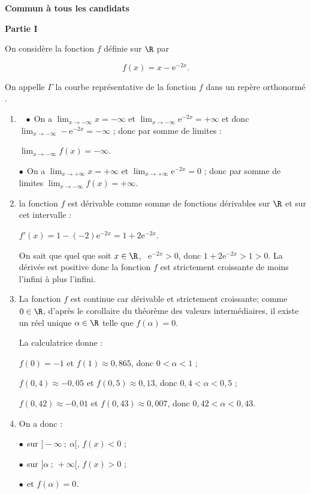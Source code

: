 
\textbf{Commun à tous les candidats}

\medskip

\begin{center}\textbf{Partie I}\end{center}

On considère la fonction $f$ définie sur $\R$ par 

\[f(x) = x - \text{e}^{-2x}.\]

On appelle $\Gamma$ la courbe représentative de la fonction $f$ dans un repère orthonormé \Oij.

\medskip

\begin{enumerate}
\item ~%
$\bullet~~$On a $\displaystyle\lim_{x \to - \infty} x = - \infty$ et $\displaystyle\lim_{x \to - \infty}\text{e}^{-2x} = + \infty$ et donc $\displaystyle\lim_{x \to - \infty}-\text{e}^{-2x} = - \infty$ ; donc par somme de limites :

$\displaystyle\lim_{x \to - \infty}f(x) = - \infty$.

$\bullet~~$On a $\displaystyle\lim_{x \to + \infty} x  = + \infty$ et $\displaystyle\lim_{x \to + \infty}\text{e}^{-2x} = 0$ ; donc par somme de limites  $\displaystyle\lim_{x \to - \infty}f(x) = + \infty$.
\item %
la fonction $f$ est dérivable comme somme de fonctions dérivables sur $\R$ et sur cet intervalle :

$f'(x) = 1 - (- 2)\text{e}^{-2x} = 1 + 2\text{e}^{-2x}$.

On sait que quel que soit $x \in \R$, \, $\text{e}^{-2x} > 0$, donc $ 1 + 2\text{e}^{-2x} > 1 > 0$.
La dérivée est positive donc la fonction $f$ est strictement croissante de moins l'infini à plus l'infini.
\item %
La fonction $f$ est continue car dérivable et strictement croissante; comme $0 \in \R$, d'après le corollaire du théorème des valeurs intermédiaires, il existe un réel unique $\alpha \in \R$ telle que $f(\alpha) = 0$.

La calculatrice donne  :

$f(0) = - 1$ et $f(1) \approx 0,865$, donc $0 < \alpha < 1$ ;

$f(0,4) \approx - 0,05$ et $f(0,5) \approx 0,13$, donc $0,4 < \alpha < 0,5$ ;

$f(0,42) \approx - 0,01$ et $f(0,43) \approx 0,007$, donc $0,42 < \alpha < 0,43$.
\item %
On a donc :

$\bullet~~$sur $]- \infty~;~\alpha[, \, f(x) < 0$ ;

$\bullet~~$sur $]\alpha~;~+ \infty[, \, f(x) > 0$ ;

$\bullet~~$et $f(\alpha) = 0$.
\end{enumerate}

